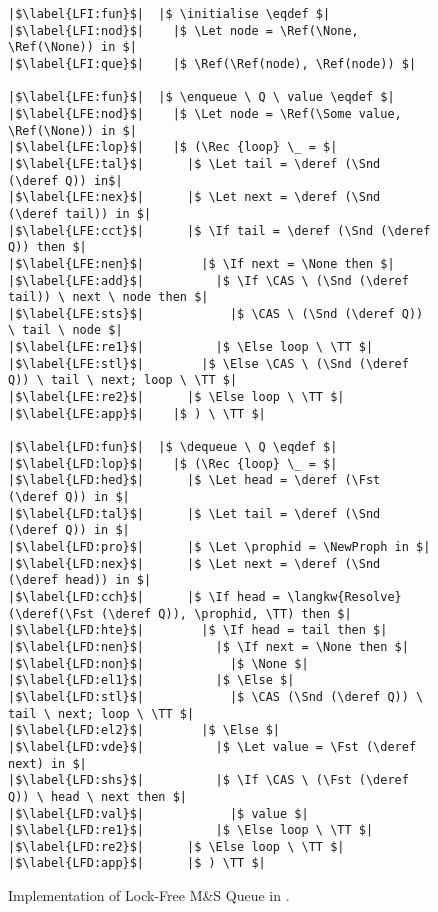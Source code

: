 \documentclass[a4paper, 10pt]{report}
\theoremstyle{definition}
\newcommand{\initialise}{\operatorname{initialize}}
\newcommand{\enqueue}{\operatorname{enqueue}}
\newcommand{\dequeue}{\operatorname{dequeue}}
\newcommand{\msq}{M\&S Queue}
\newcommand{\lfmsq}{Lock-Free \msq{}}
\begin{document}
\begin{figure}
\begin{verbatim}
|$\label{LFI:fun}$|  |$ \initialise \eqdef $|
|$\label{LFI:nod}$|    |$ \Let node = \Ref(\None, \Ref(\None)) in $|
|$\label{LFI:que}$|    |$ \Ref(\Ref(node), \Ref(node)) $|

|$\label{LFE:fun}$|  |$ \enqueue \ Q \ value \eqdef $|
|$\label{LFE:nod}$|    |$ \Let node = \Ref(\Some value, \Ref(\None)) in $|
|$\label{LFE:lop}$|    |$ (\Rec {loop} \_ = $|
|$\label{LFE:tal}$|      |$ \Let tail = \deref (\Snd (\deref Q)) in$|
|$\label{LFE:nex}$|      |$ \Let next = \deref (\Snd (\deref tail)) in $|
|$\label{LFE:cct}$|      |$ \If tail = \deref (\Snd (\deref Q)) then $|
|$\label{LFE:nen}$|        |$ \If next = \None then $|
|$\label{LFE:add}$|          |$ \If \CAS \ (\Snd (\deref tail)) \ next \ node then $|
|$\label{LFE:sts}$|            |$ \CAS \ (\Snd (\deref Q)) \ tail \ node $|
|$\label{LFE:re1}$|          |$ \Else loop \ \TT $|
|$\label{LFE:stl}$|        |$ \Else \CAS \ (\Snd (\deref Q)) \ tail \ next; loop \ \TT $|
|$\label{LFE:re2}$|      |$ \Else loop \ \TT $|
|$\label{LFE:app}$|    |$ ) \ \TT $|

|$\label{LFD:fun}$|  |$ \dequeue \ Q \eqdef $|
|$\label{LFD:lop}$|    |$ (\Rec {loop} \_ = $|
|$\label{LFD:hed}$|      |$ \Let head = \deref (\Fst (\deref Q)) in $|
|$\label{LFD:tal}$|      |$ \Let tail = \deref (\Snd (\deref Q)) in $|
|$\label{LFD:pro}$|      |$ \Let \prophid = \NewProph in $|
|$\label{LFD:nex}$|      |$ \Let next = \deref (\Snd (\deref head)) in $|
|$\label{LFD:cch}$|      |$ \If head = \langkw{Resolve} (\deref(\Fst (\deref Q)), \prophid, \TT) then $|
|$\label{LFD:hte}$|        |$ \If head = tail then $|
|$\label{LFD:nen}$|          |$ \If next = \None then $|
|$\label{LFD:non}$|            |$ \None $|
|$\label{LFD:el1}$|          |$ \Else $|
|$\label{LFD:stl}$|            |$ \CAS (\Snd (\deref Q)) \ tail \ next; loop \ \TT $|
|$\label{LFD:el2}$|        |$ \Else $|
|$\label{LFD:vde}$|          |$ \Let value = \Fst (\deref next) in $|
|$\label{LFD:shs}$|          |$ \If \CAS \ (\Fst (\deref Q)) \ head \ next then $|
|$\label{LFD:val}$|            |$ value $|
|$\label{LFD:re1}$|          |$ \Else loop \ \TT $|
|$\label{LFD:re2}$|      |$ \Else loop \ \TT $|
|$\label{LFD:app}$|      |$ ) \TT $|
\end{verbatim}
\caption{Implementation of \lfmsq{} in \heaplang.}
\end{figure}
\end{document}
